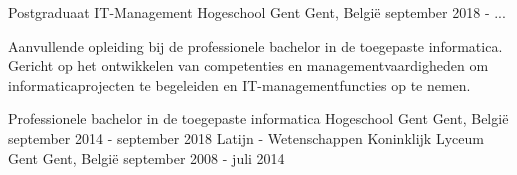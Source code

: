 


\begin{cventries}

\cventry
{Postgraduaat IT-Management} %
{Hogeschool Gent} %
{Gent, België} %
{september 2018 - ...} %
{ %
\begin{cvitems}
\item {Aanvullende opleiding bij de professionele bachelor in de toegepaste informatica. Gericht op het ontwikkelen van competenties en managementvaardigheden om informaticaprojecten te begeleiden en
IT-managementfuncties op te nemen.}
\end{cvitems}
}

\cventry
{Professionele bachelor in de toegepaste informatica} %
{Hogeschool Gent} %
{Gent, België} %
{september 2014 - september 2018} %
{ %
}
\cventry
{Latijn - Wetenschappen} %
{Koninklijk Lyceum Gent} %
{Gent, België} %
{september 2008 - juli 2014} %
{ %
}


\end{cventries}